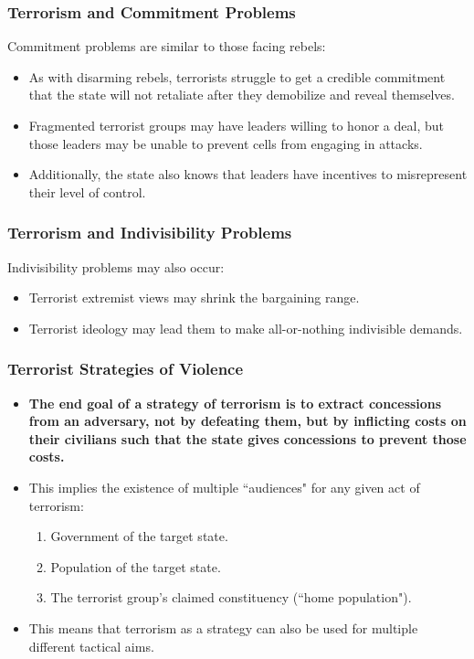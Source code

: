 \documentclass[handout]{beamer}
\begin{document}
\begin{frame} 
	\frametitle{\LARGE{Terrorism and Commitment Problems}}
Commitment problems are similar to those facing rebels:
	\begin{itemize}
		\item As with disarming rebels, terrorists struggle to get a credible commitment that the state will not retaliate after they demobilize and reveal themselves. \pause
		\item Fragmented terrorist groups may have leaders willing to honor a deal, but those leaders may be unable to prevent cells from engaging in attacks. \pause
		\item Additionally, the state also knows that leaders have incentives to misrepresent their level of control. 
	\end{itemize}
\end{frame}

\begin{frame} 
	\frametitle{\LARGE{Terrorism and Indivisibility Problems}}
Indivisibility problems may also occur:
	\begin{itemize}
		\item Terrorist extremist views may shrink the bargaining range. \pause
		\item Terrorist ideology may lead them to make all-or-nothing indivisible demands.
	\end{itemize}
\end{frame}

\begin{frame} 
	\frametitle{\LARGE{Terrorist Strategies of Violence}}
	\begin{itemize}
		\item \textbf{The end goal of a strategy of terrorism is to extract concessions from an adversary, not by defeating them, but by inflicting costs on their civilians such that the state gives concessions to prevent those costs.} \pause
		\item This implies the existence of multiple ``audiences" for any given act of terrorism:
		\begin{enumerate}
			\item Government of the target state.
			\item Population of the target state.
			\item The terrorist group's claimed constituency (``home population"). \pause
		\end{enumerate}
	\item This means that terrorism as a strategy can also be used for multiple different tactical aims.
	\end{itemize}
\end{frame}
\end{document}
